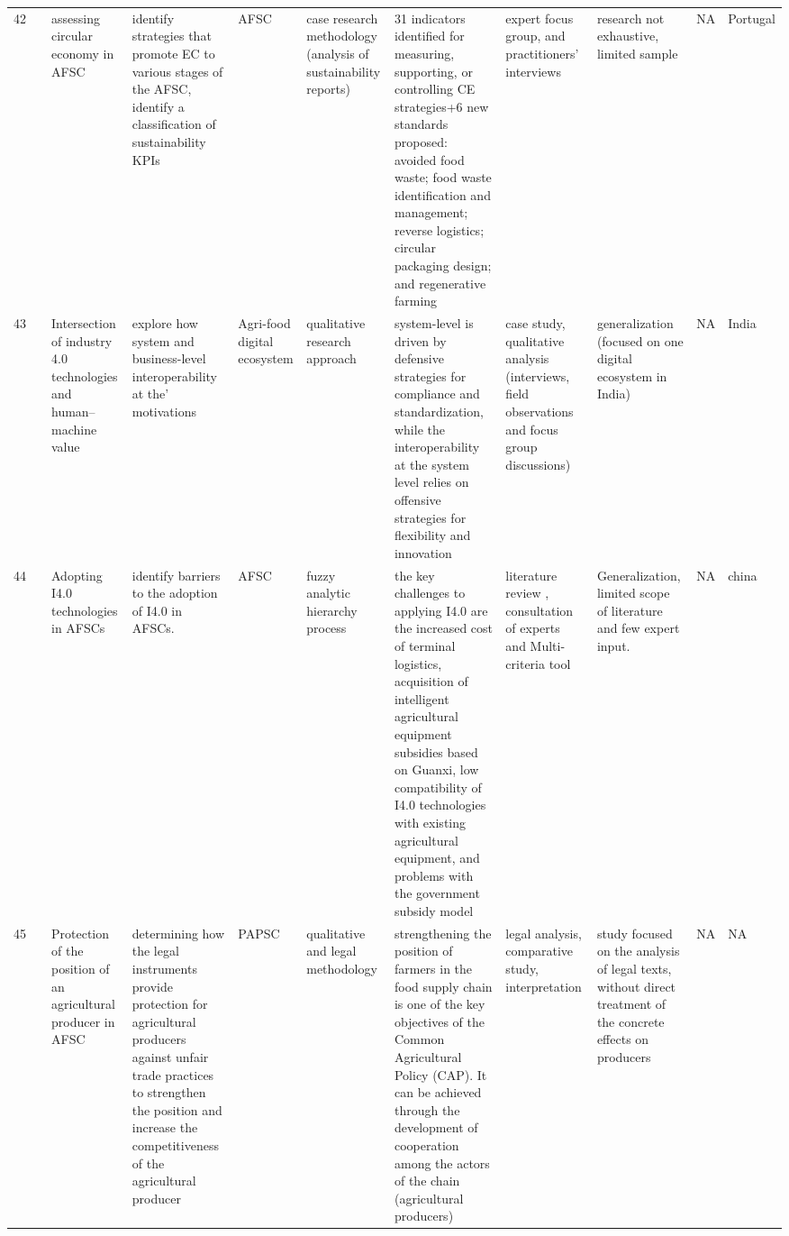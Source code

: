 \documentclass[a4paper,10pt]{article}
\begin{document}
\begin{landscape}
\begin{small}
\begin{longtable}{p{0.5cm} p{2cm} p{2.5cm} p{4cm} p{1cm} p{2.5cm} p{5.5cm} p{2.5cm} p{2.5cm} p{1.8cm} p{1.5cm}}
42 & \textcite{veloso11} &  assessing circular economy in AFSC&identify strategies that promote EC to various stages of the AFSC, identify a classification of sustainability KPIs & AFSC &case research methodology (analysis of sustainability reports)  & 31 indicators identified for measuring, supporting, or controlling CE strategies+6 new standards proposed: avoided food waste; food waste identification and management; reverse logistics; circular packaging design; and regenerative farming& expert focus group, and practitioners’ interviews & research not exhaustive, limited sample & NA & Portugal  \\
43 & \textcite{obayi12} &Intersection of industry 4.0 technologies and human–machine value&explore how system and business-level interoperability at the’ motivations & Agri-food digital ecosystem & qualitative research approach & system-level is driven by defensive strategies for compliance and standardization, while the interoperability at the system level relies on offensive strategies for flexibility and innovation& case study, qualitative analysis (interviews, field observations and focus group discussions) & generalization (focused on one digital ecosystem in India)  & NA& India  \\
44 &  \textcite{zhao14} & Adopting I4.0 technologies in AFSCs&identify barriers to the adoption of I4.0 in AFSCs. & AFSC & fuzzy analytic hierarchy process & the key challenges to applying I4.0 are the increased cost of terminal logistics, acquisition of intelligent agricultural equipment subsidies based on Guanxi, low compatibility of I4.0 technologies with existing agricultural equipment, and problems with the government subsidy model& literature review , consultation of experts and Multi-criteria tool & Generalization, limited scope of literature and few expert input.& NA& china\\
45 & \textcite{lipinska16} & Protection of the position of an agricultural producer in AFSC& determining how the legal instruments provide protection for agricultural producers against unfair trade practices to strengthen the position and increase the competitiveness of the agricultural producer & PAPSC & qualitative and legal methodology & strengthening the position of farmers in the food supply chain is one of the key objectives of the Common Agricultural Policy (CAP). It can be achieved through the development of cooperation among the actors of the chain (agricultural producers)& legal analysis, comparative study, interpretation & study focused on the analysis of legal texts, without direct treatment of the concrete effects on producers & NA& NA \\

\end{longtable}
\end{small}
\end{landscape}
\end{document}

